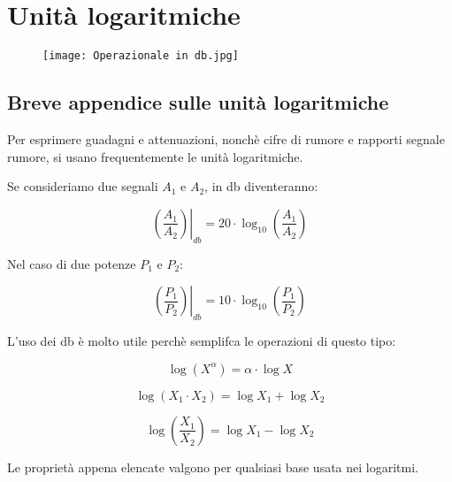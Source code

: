 \chapter{Unità logaritmiche} 

\begin{figure}[h]
    \centering
    \texttt{[image: Operazionale in db.jpg]}
\end{figure}  

\newpage 

\section{Breve appendice sulle unità logaritmiche} 

Per esprimere guadagni e attenuazioni, nonchè cifre di rumore e rapporti segnale rumore, 
si usano frequentemente le unità logaritmiche. \newline 

Se consideriamo due segnali $A_1$ e $A_2$, in db diventeranno:

{
    \Large 
    \begin{equation}
        \left. (\frac{A_1}{A_2}) \right|_{db} 
        = 20 \cdot \log_{10} (\frac{A_1}{A_2})
    \end{equation}
}

Nel caso di due potenze $P_1$ e $P_2$: 

{
    \Large 
    \begin{equation}
        \left. (\frac{P_1}{P_2}) \right|_{db} 
        = 10 \cdot \log_{10} (\frac{P_1}{P_2})
    \end{equation}
}


L'uso dei db è molto utile perchè semplifca le operazioni di questo tipo:

{
    \Large 
    \begin{equation}
        \log(X^{\alpha}) = \alpha \cdot \log X 
    \end{equation}
}

{
    \Large 
    \begin{equation}
        \log(X_1 \cdot X_2) = \log X_1 +  \log X_2 
    \end{equation}
}

{
    \Large 
    \begin{equation}
        \log(\frac{X_1}{X_2}) = \log X_1 -  \log X_2 
    \end{equation}
}

Le proprietà appena elencate valgono per qualsiasi base usata nei logaritmi. \newline 

